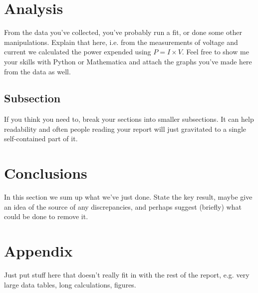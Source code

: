 \documentclass[11pt]{article}
\begin{document}
\section{Analysis}
From the data you've collected, you've probably run a fit, or done some other manipulations. Explain that here, i.e. from the measurements of voltage and current we calculated the power expended using $P = I \times V$.  
Feel free to show me your skills with Python or Mathematica and attach the graphs you've made here from the data as well. 

\subsection{Subsection}
If you think you need to, break your sections into smaller subsections. It can help readability and often people reading your report will just gravitated to a single self-contained part of it.

\section{Conclusions}
In this section we sum up what we've just done. State the key result, maybe give an idea of the source of any discrepancies, and perhaps suggest (briefly) what could be done to remove it.

\appendix
\section{Appendix}
Just put stuff here that doesn't really fit in with the rest of the report, e.g. very large data tables, long calculations, figures.

\end{document}
